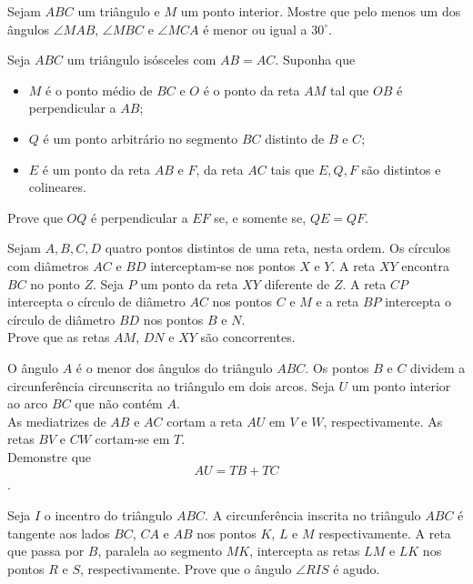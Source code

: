 \begin{questao}
  Sejam $ABC$ um triângulo e $M$ um ponto
  interior. Mostre que pelo menos um dos ângulos
  $\angle MAB$, $\angle MBC$ e $\angle MCA$ é menor ou igual a
  $30^\circ$.
\end{questao}

\begin{questao}
  Seja $ABC$ um triângulo isósceles com $AB=AC$. Suponha
  que
  \begin{itemize}
    \item $M$ é o ponto médio de $BC$ e $O$ é o ponto da reta $AM$ tal que $OB$ é
    perpendicular a $AB$;

    \item $Q$ é um ponto arbitrário no segmento $BC$ distinto de $B$ e $C$;

    \item $E$ é um ponto da reta $AB$ e $F$, da reta $AC$ tais que $E,Q,F$ são
    distintos e colineares.
  \end{itemize}

  Prove que $OQ$ é perpendicular a $EF$ se, e somente se, $QE=QF$.
\end{questao}

\begin{questao}
  Sejam $A,B,C,D$ quatro pontos distintos de uma reta,
  nesta ordem. Os círculos com diâmetros $AC$ e $BD$
  interceptam-se nos pontos $X$ e $Y$. A reta $XY$ encontra
  $BC$ no ponto $Z$. Seja $P$ um ponto da reta $XY$ diferente
  de $Z$. A reta $CP$ intercepta o círculo de diâmetro $AC$ nos
  pontos $C$ e $M$ e a reta $BP$ intercepta o círculo de
  diâmetro $BD$ nos pontos $B$ e $N$.\\
  Prove que as retas $AM$, $DN$ e $XY$ são concorrentes.
\end{questao}

\begin{questao}
  O ângulo $A$ é o menor dos ângulos do triângulo
  $ABC$. Os pontos $B$ e $C$ dividem a circunferência
  circunscrita ao triângulo em dois arcos. Seja $U$ um ponto
  interior ao arco $BC$ que não contém $A$.\\
  As mediatrizes de $AB$ e $AC$ cortam a reta $AU$ em $V$ e
  $W$, respectivamente. As retas $BV$ e $CW$ cortam-se em
  $T$.\\
  Demonstre que $$AU = TB + TC$$.
\end{questao}

\begin{questao}
  Seja $I$ o incentro do triângulo $ABC$. A
  circunferência inscrita no triângulo $ABC$ é tangente aos lados
  $BC$, $CA$ e $AB$ nos pontos $K$, $L$ e $M$
  respectivamente. A reta que passa por $B$, paralela ao segmento
  $MK$, intercepta as retas $LM$ e $LK$ nos pontos $R$ e
  $S$, respectivamente. Prove que o ângulo $\angle RIS$ é agudo.
\end{questao}

